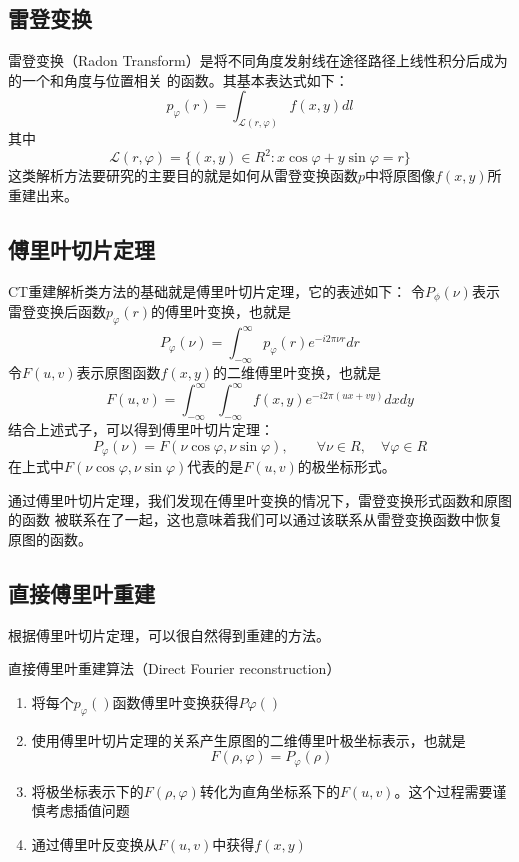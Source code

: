 \subsection{雷登变换}
雷登变换（Radon Transform）是将不同角度发射线在途径路径上线性积分后成为的一个和角度与位置相关
的函数。其基本表达式如下：
\begin{equation*}
p_\varphi(r)=\int_{\mathcal{L}(r,\varphi)}f(x,y)dl
\end{equation*}
其中
\begin{equation*}
\mathcal{L}(r,\varphi)=\{(x,y)\in R^2:x\cos\varphi+y\sin\varphi=r\}
\end{equation*}
这类解析方法要研究的主要目的就是如何从雷登变换函数$p$中将原图像$f(x,y)$所重建出来。

\subsection{傅里叶切片定理}
CT重建解析类方法的基础就是傅里叶切片定理，它的表述如下：
令$P_\phi(\nu)$表示雷登变换后函数$p_\varphi(r)$的傅里叶变换，也就是
\begin{equation*}
P_\varphi(\nu)=\int^\infty_{-\infty}p_\varphi(r)e^{-i2\pi \nu r}dr
\end{equation*}
令$F(u,v)$表示原图函数$f(x,y)$的二维傅里叶变换，也就是
\begin{equation*}
F(u,v)=\int^\infty_{-\infty}\int^\infty_{-\infty}f(x,y)e^{-i2\pi(ux+vy)}dxdy
\end{equation*}
结合上述式子，可以得到傅里叶切片定理：
\begin{equation*}
P_\varphi(\nu)=F(\nu\cos\varphi,\nu\sin\varphi),\qquad \forall\nu\in R,\quad\forall\varphi\in R
\end{equation*}
在上式中$F(\nu\cos\varphi,\nu\sin\varphi)$代表的是$F(u,v)$的极坐标形式。

通过傅里叶切片定理，我们发现在傅里叶变换的情况下，雷登变换形式函数和原图的函数
被联系在了一起，这也意味着我们可以通过该联系从雷登变换函数中恢复原图的函数。

\subsection{直接傅里叶重建}
根据傅里叶切片定理，可以很自然得到重建的方法\cite{de1968reconstruction}。
\begin{algo}
直接傅里叶重建算法（Direct Fourier reconstruction）
\begin{enumerate}
\item 将每个$p_\varphi()$函数傅里叶变换获得$P\varphi()$
\item 使用傅里叶切片定理的关系产生原图的二维傅里叶极坐标表示，也就是
\begin{equation*}
F(\rho,\varphi)=P_\varphi(\rho)
\end{equation*}
\item 将极坐标表示下的$F(\rho,\varphi)$转化为直角坐标系下的$F(u,v)$。这个过程需要谨慎考虑插值问题
\item 通过傅里叶反变换从$F(u,v)$中获得$f(x,y)$
\end{enumerate}
\end{algo}

